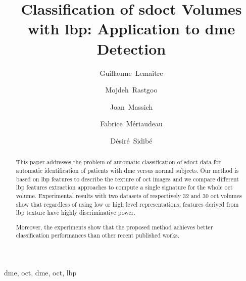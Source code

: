 \title{Classification of \acs*{sdoct} Volumes with \acs*{lbp}: Application to \acs*{dme} Detection}


\author[le2i,vicorob]{Guillaume~Lema\^itre}
\author[le2i,vicorob]{Mojdeh~Rastgoo}
\author[le2i]{Joan~Massich}

\author[le2i]{Fabrice~M\'eriaudeau}
\author[le2i]{D\'esir\'e~Sidib\'e}

\address[le2i]{ViCOROB, Universitat de Girona, Campus Montilivi, Edifici P4, 17071 Girona, Spain}
\address[vicorob]{LE2I UMR6306, CNRS, Arts et M\'etiers, Univ. Bourgogne Franche-Comt\'e, 12 rue de la Fonderie, 71200 Le Creusot, France}

\begin{abstract}
\acresetall  %
This paper addresses the problem of automatic classification of \ac{sdoct} data for automatic identification of patients with \ac{dme} versus normal subjects.
Our method is based on \ac{lbp} features to describe the texture of \ac{oct} images and we compare different \ac{lbp} features extraction approaches to compute a single signature for the whole \ac{oct} volume.
Experimental results with two datasets of respectively 32 and 30 \ac{oct} volumes show that
regardless of using low or high level representations, features derived from \ac{lbp} texture have highly discriminative power.%

Moreover, the experiments show that the proposed method achieves better classification performances than other recent published works.
\end{abstract}

\begin{keyword}
\acl{dme}, \acl{oct}, \acs{dme}, \acs{oct}, \ac{lbp}
\end{keyword}

